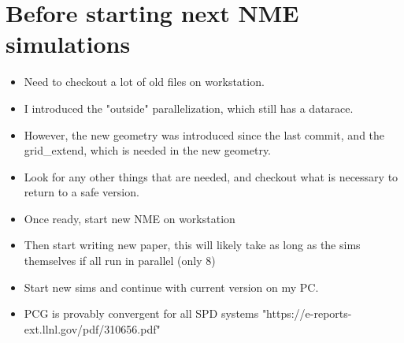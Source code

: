 \documentclass[11pt]{article}
\begin{document}
\section{Before starting next NME simulations}
\begin{itemize}
\setlength\itemsep{-1em}
\item Need to checkout a lot of old files on workstation.
\item I introduced the "outside" parallelization, which still has a datarace.
\item However, the new geometry was introduced since the last commit, and the grid\_extend, which is needed in the new geometry.
\item Look for any other things that are needed, and checkout what is necessary to return to a safe version.
\item Once ready, start new NME on workstation
\item Then start writing new paper, this will likely take as long as the sims themselves if all run in parallel (only 8)
\item Start new sims and continue with current version on my PC.
\item PCG is provably convergent for all SPD systems "https://e-reports-ext.llnl.gov/pdf/310656.pdf"
\end{itemize}
\end{document}
